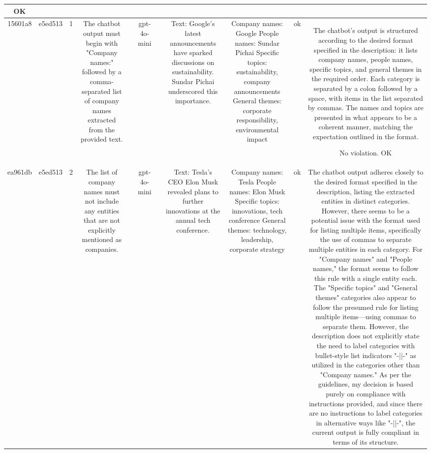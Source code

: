 \begin{table}[h!]
\begin{tabular}{|c|c|c|c|c|c|c|c|c|c|c|}
OK\\
\hline
15601a8 & e5ed513 & 1 & The chatbot output must begin with "Company names:" followed by a comma-separated list of company names extracted from the provided text. &  & gpt-4o-mini &  & Text: Google's latest announcements have sparked discussions on sustainability. Sundar Pichai underscored this importance. & Company names: Google
People names: Sundar Pichai
Specific topics: sustainability, company announcements
General themes: corporate responsibility, environmental impact & ok & The chatbot's output is structured according to the desired format specified in the description: it lists company names, people names, specific topics, and general themes in the required order. Each category is separated by a colon followed by a space, with items in the list separated by commas. The names and topics are presented in what appears to be a coherent manner, matching the expectation outlined in the format.

No violation.
OK\\
\hline
ea961db & e5ed513 & 2 & The list of company names must not include any entities that are not explicitly mentioned as companies. &  & gpt-4o-mini &  & Text: Tesla's CEO Elon Musk revealed plans to further innovations at the annual tech conference. & Company names: Tesla
People names: Elon Musk
Specific topics: innovations, tech conference
General themes: technology, leadership, corporate strategy & ok & The chatbot output adheres closely to the desired format specified in the description, listing the extracted entities in distinct categories. However, there seems to be a potential issue with the format used for listing multiple items, specifically the use of commas to separate multiple entities in each category. For "Company names" and "People names," the format seems to follow this rule with a single entity each. The "Specific topics" and "General themes" categories also appear to follow the presumed rule for listing multiple items—using commas to separate them. However, the description does not explicitly state the need to label categories with bullet-style list indicators "-||-" as utilized in the categories other than "Company names." As per the guidelines, my decision is based purely on compliance with instructions provided, and since there are no instructions to label categories in alternative ways like "-||-", the current output is fully compliant in terms of its structure. 


\end{tabular}
\end{table}
